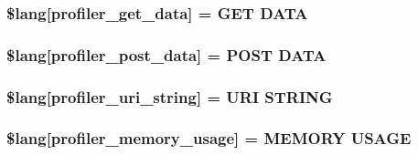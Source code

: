 \subsubsection[{\$lang}]{\setlength{\rightskip}{0pt plus 5cm}\$lang\mbox{[}\textquotesingle{}profiler\+\_\+get\+\_\+data\textquotesingle{}\mbox{]} = \textquotesingle{}G\+E\+T D\+A\+T\+A\textquotesingle{}}\label{profiler__lang_8php_aed0d74a29b2ef17977baa94091d06058}
\hypertarget{profiler__lang_8php_a6b2928f829db3649049332dc4468018d}{}
\subsubsection[{\$lang}]{\setlength{\rightskip}{0pt plus 5cm}\$lang\mbox{[}\textquotesingle{}profiler\+\_\+post\+\_\+data\textquotesingle{}\mbox{]} = \textquotesingle{}P\+O\+S\+T D\+A\+T\+A\textquotesingle{}}\label{profiler__lang_8php_a6b2928f829db3649049332dc4468018d}
\hypertarget{profiler__lang_8php_a1f1644f4e586555cb83f718552502136}{}
\subsubsection[{\$lang}]{\setlength{\rightskip}{0pt plus 5cm}\$lang\mbox{[}\textquotesingle{}profiler\+\_\+uri\+\_\+string\textquotesingle{}\mbox{]} = \textquotesingle{}U\+R\+I S\+T\+R\+I\+N\+G\textquotesingle{}}\label{profiler__lang_8php_a1f1644f4e586555cb83f718552502136}
\hypertarget{profiler__lang_8php_aaffc8cc3dd25f21388a6edb5fbfc8859}{}
\subsubsection[{\$lang}]{\setlength{\rightskip}{0pt plus 5cm}\$lang\mbox{[}\textquotesingle{}profiler\+\_\+memory\+\_\+usage\textquotesingle{}\mbox{]} = \textquotesingle{}M\+E\+M\+O\+R\+Y U\+S\+A\+G\+E\textquotesingle{}}\label{profiler__lang_8php_aaffc8cc3dd25f21388a6edb5fbfc8859}
\hypertarget{profiler__lang_8php_a68a43f2ac48abfc21cd12ee19e75e421}{}

